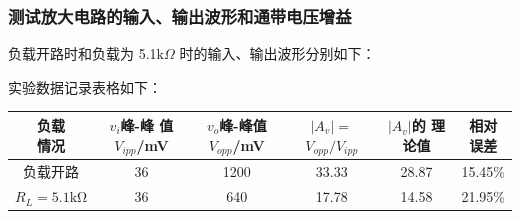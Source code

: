 \documentclass[a4paper,11pt,UTF8]{article}
\numberwithin{equation}{subsection}
\begin{document}
\subsubsection{测试放大电路的输入、输出波形和通带电压增益}
负载开路时和负载为 5.1$\text{k}\Omega$ 时的输入、输出波形分别如下：

\begin{figure}[H]
\end{figure}

实验数据记录表格如下：

\begin{table}[H]
	\centering
	\begin{tabular}{|c|c|c|c|c|c|}
			\hline
			\shortstack{负载\\情况} & \shortstack{$v_i$峰-峰\\值$V_{ipp}$/mV} & 
			\shortstack{$v_o$峰-峰值\\$V_{opp}$/mV} & 
			\shortstack{$|A_v|=$\\$V_{opp}/V_{ipp}$} & 
			\shortstack{$|A_v|$的\\理论值} & 
			\shortstack{相对\\误差}\\
			\hline
			负载开路 & 36 & 1200 & 33.33 & 28.87 & 15.45\%\\
			\hline
			$R_L=5.1\mathrm{k\Omega}$ & 36 & 640 & 17.78 & 14.58 & 21.95\%\\
			\hline		
		\end{tabular}
\end{table}
\end{document}
